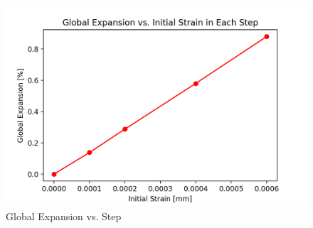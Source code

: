 \begin{figure}[ht!]
\centering
\includegraphics[width=.8\linewidth]{Files/exp_plot/DEFA30X0C_exp.png}
  \caption{Global Expansion vs. Step}
  \label{fig:DEFA30X0C_exp}
\end{figure}

